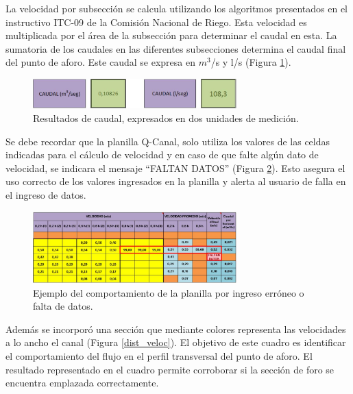 \documentclass[]{article}
\begin{document}
La velocidad por subsección se calcula utilizando los algoritmos presentados en el instructivo ITC-09 de la Comisión Nacional de Riego. Esta velocidad es multiplicada por el área de la subsección para determinar el caudal en esta. La sumatoria de los caudales en las diferentes subsecciones determina el caudal final del punto de aforo. Este caudal se expresa en $m^3$/s y l/s (Figura \ref{res_q}).\\

\begin{figure}[H]
\centering
\includegraphics[width=0.7\textwidth]{images/caudal.eps}
\caption{Resultados de caudal, expresados en dos unidades de medición.}
\label{res_q}
\end{figure}

Se debe recordar que la planilla Q-Canal, solo utiliza los valores de las celdas indicadas para el cálculo de velocidad y en caso de que falte algún dato de velocidad, se indicara el mensaje “FALTAN DATOS” (Figura \ref{faltan_d}). Esto asegura el uso correcto de los valores ingresados en la planilla y alerta al usuario de falla en el ingreso de datos.\\

\begin{figure}[H]
\centering
\includegraphics[width=0.7\textwidth]{images/faltan_datos.eps}
\caption{Ejemplo del comportamiento de la planilla por ingreso erróneo o falta de datos.}
\label{faltan_d}
\end{figure}

Además se incorporó una sección que mediante colores representa las velocidades a lo ancho el canal (Figura \ref{dist_veloc}). El objetivo de este cuadro es identificar el comportamiento del flujo en el perfil transversal del punto de aforo. El resultado representado en el cuadro permite corroborar si la sección de foro se encuentra emplazada correctamente. 
\end{document}
